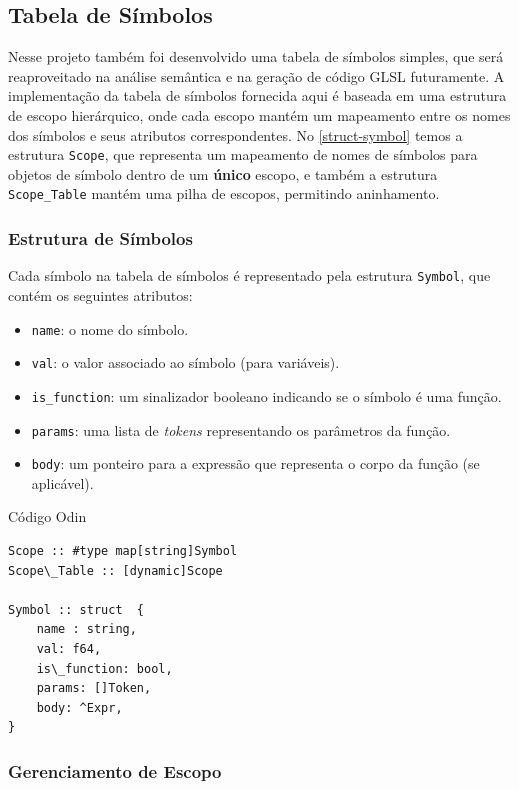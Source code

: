 \documentclass[english, 
               brazil, 
               bsc] %
               {dcomp-abntex2}
\begin{document}
\subsection{Tabela de Símbolos}

Nesse projeto também foi desenvolvido uma tabela de símbolos simples, que será reaproveitado na análise semântica e na geração de código GLSL futuramente. A implementação da tabela de símbolos fornecida aqui é baseada em uma estrutura de escopo hierárquico, onde cada escopo mantém um mapeamento entre os nomes dos símbolos e seus atributos correspondentes. No \autoref{struct-symbol} temos a estrutura \texttt{Scope}, que representa um mapeamento de nomes de símbolos para objetos de símbolo dentro de um \textbf{único} escopo, e também a estrutura \texttt{Scope\_Table} mantém uma pilha de escopos, permitindo aninhamento.

\subsubsection{Estrutura de Símbolos}

Cada símbolo na tabela de símbolos é representado pela estrutura \texttt{Symbol}, que contém os seguintes atributos:
\begin{itemize}
    \item \texttt{name}: o nome do símbolo.
    \item \texttt{val}: o valor associado ao símbolo (para variáveis).
    \item \texttt{is\_function}: um sinalizador booleano indicando se o símbolo é uma função.
    \item \texttt{params}: uma lista de \textit{tokens} representando os parâmetros da função.
    \item \texttt{body}: um ponteiro para a expressão que representa o corpo da função (se aplicável).
\end{itemize}


\begin{codigo}[htb]
\caption{Código Odin}
\label{struct-symbol}
\begin{lstlisting}
Scope :: #type map[string]Symbol
Scope\_Table :: [dynamic]Scope

Symbol :: struct  {
    name : string,
    val: f64,
    is\_function: bool,
    params: []Token,
    body: ^Expr,
}

\end{lstlisting}
\end{codigo}

\subsubsection{Gerenciamento de Escopo}
\end{document}
